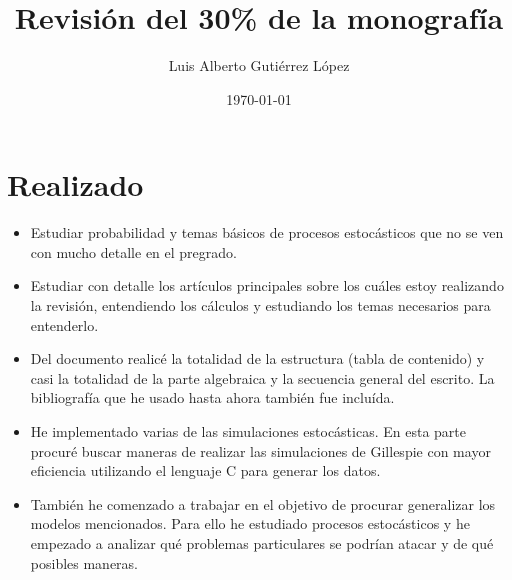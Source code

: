 \documentclass[12pt, letterpaper]{article}
\author{Luis Alberto Guti\'errez L\'opez}
\date{\today}
\title{\textbf{Revisi\'on del 30\% de la monograf\'ia}}
\begin{document}
\maketitle

\section*{Realizado}
\begin{itemize}
  \item Estudiar probabilidad y temas b\'asicos de procesos estoc\'asticos que no se ven con mucho detalle en el pregrado.
  \item Estudiar con detalle los art\'iculos principales sobre los cu\'ales estoy realizando la revisi\'on, entendiendo los c\'alculos y estudiando los temas necesarios para entenderlo.
  \item Del documento realic\'e la totalidad de la estructura (tabla de contenido) y casi la totalidad de la parte algebraica y la secuencia general del escrito. La bibliograf\'ia que he usado hasta ahora tambi\'en fue inclu\'ida.
  \item He implementado varias de las simulaciones estoc\'asticas. En esta parte procur\'e buscar maneras de realizar las simulaciones de Gillespie con mayor eficiencia utilizando el lenguaje C para generar los datos. 
  \item Tambi\'en he comenzado a trabajar en el objetivo de procurar generalizar los modelos mencionados. Para ello he estudiado procesos estoc\'asticos y he empezado a analizar qu\'e problemas particulares se podr\'ian atacar y de qu\'e posibles maneras.
\end{itemize}
\end{document}

